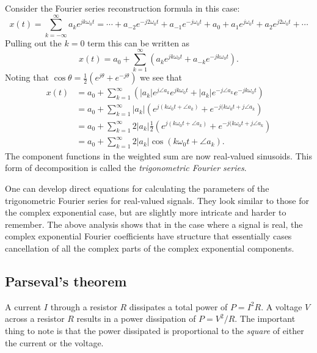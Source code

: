 \documentclass[10pt]{beamer}
\begin{document}
Consider the Fourier series reconstruction formula in this case:
\begin{equation*}
  x(t) = \sum_{k=-\infty}^{\infty} a_k e^{j k \omega_0 t} 
  = \cdots + a_{-2} e^{-j 2 \omega_0 t} + a_{-1} e^{-j \omega_0 t} + a_0 
  + a_1 e^{j \omega_0 t} + a_2 e^{j 2 \omega_0 t} + \cdots
\end{equation*}
Pulling out the $k=0$ term this can be written as
\begin{equation*}
  x(t) = a_0 +  \sum_{k=1}^{\infty} (a_k e^{j k\omega_0 t} + a_{-k} e^{-j k \omega_0 t}).
\end{equation*}
Noting that $\cos \theta = \frac{1}{2} (e^{j \theta} + e^{-j \theta})$ we see that
\begin{align*}
  x(t) &= a_0 +  \sum_{k=1}^{\infty} (|a_k|e^{j \angle a_k} e^{j k\omega_0 t} + |a_k| e^{-j \angle a_k} e^{-j k \omega_0 t}) \\
  &= a_0 +  \sum_{k=1}^{\infty} |a_k| (e^{j (k\omega_0 t + \angle a_k)} + e^{-j (k \omega_0 t + j \angle a_k}) \\
  &= a_0 +  \sum_{k=1}^{\infty} 2 |a_k| \frac{1}{2} (e^{j (k\omega_0 t + \angle a_k)} + e^{-j (k \omega_0 t + j \angle a_k}) \\
  &= a_0 +  \sum_{k=1}^{\infty} 2 |a_k| \cos (k\omega_0 t + \angle a_k).
\end{align*}
The component functions in the weighted sum are now real-valued sinusoids.  This form of decomposition is called the {\em trigonometric Fourier series}.

One can develop direct equations for calculating the parameters of the trigonometric Fourier series for real-valued signals.  They look similar to those for the complex exponential case, but are slightly more intricate and harder to remember.  The above analysis shows that in the case where a signal is real, the complex exponential Fourier coefficients have structure that essentially cases cancellation of all the complex parts of the complex exponential components.

\subsection{Parseval's theorem}

A current $I$ through a resistor $R$ dissipates a total power of $P = I^2 R$.  A voltage $V$ across a resistor $R$ results in a power dissipation of $P = V^2/R$.  The important thing to note is that the power dissipated is proportional to the {\em square} of either the current or the voltage.  
\end{document}
